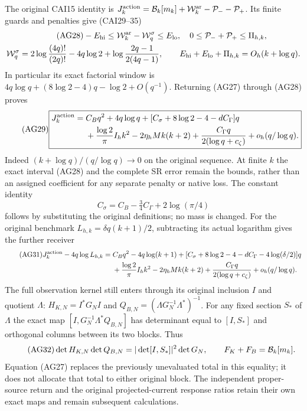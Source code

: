 \documentclass[11pt]{article}
\begin{document}
The original CAI15 identity is
$J_k^{\rm action}=\mathcal B_k[m_k]+\mathcal W_k^{\rm ar}-\mathcal P_--\mathcal P_+$.
Its finite guards and penalties give (CAI29--35)
\begin{gather}\tag{AG28}
 -E_{\rm hi}\le\mathcal W_k^{\rm ar}-\mathcal W_q^\sigma\le E_{\rm lo},
 \quad0\le\mathcal P_-+\mathcal P_+\le\Pi_{h,k},\\
 \mathcal W_q^\sigma=2\log\frac{(4q)!}{(2q)!}-4q\log2
       +\log\frac{2q-1}{2(4q-1)},\qquad
 E_{\rm hi}+E_{\rm lo}+\Pi_{h,k}=O_h(k+\log q).\notag
\end{gather}
In particular its exact factorial window is
$4q\log q+(8\log2-4)q-\log2+O(q^{-1})$.
Returning (AG27) through (AG28) proves
\begin{equation}\tag{AG29}
 \boxed{\begin{aligned}J_k^{\rm action}={}&C_Bq^2+4q\log q
  +[C_\sigma+8\log2-4-dC_\Gamma]q\\
 &+\frac{\log2}{\pi}I_hk^2-2\eta_hMk(k+2)
  +\frac{C_\Gamma q}{2(\log q+c_\zeta)}+o_h(q/\log q).
 \end{aligned}}
\end{equation}
Indeed $(k+\log q)/(q/\log q)\to0$ on the original sequence. At finite $k$
the exact interval (AG28) and the complete SR error remain the bounds,
rather than an assigned coefficient for any separate penalty or native loss.
The constant identity
\begin{equation}\tag{AG30}
 C_\sigma=C_B-\tfrac34 C_\Gamma+2\log(\pi/4)
\end{equation}
follows by substituting the original definitions; no mass is changed.
For the original benchmark $L_{h,k}=\delta q(k+1)/2$, subtracting its
actual logarithm gives the further receiver
\begin{align}\tag{AG31}
 J_k^{\rm action}-4q\log L_{h,k}
 ={}&C_Bq^2-4q\log(k+1)
 +[C_\sigma+8\log2-4-dC_\Gamma-4\log(\delta/2)]q\\
 &+\frac{\log2}{\pi}I_hk^2-2\eta_hMk(k+2)
 +\frac{C_\Gamma q}{2(\log q+c_\zeta)}+o_h(q/\log q).\notag
\end{align}
The full observation kernel still enters through its original inclusion
$I$ and quotient $\Lambda$: $H_{K,N}=I^*G_NI$ and
$Q_{B,N}=(\Lambda G_N^{-1}\Lambda^*)^{-1}$.
For any fixed section $S_*$ of $\Lambda$ the exact map
$[I,G_N^{-1}\Lambda^*Q_{B,N}]$ has determinant equal to $[I,S_*]$ and
orthogonal columns between its two blocks. Thus
\begin{equation}\tag{AG32}
 \det H_{K,N}\det Q_{B,N}=|\det[I,S_*]|^2\det G_N,
 \qquad F_K+F_B=\mathcal B_k[m_k].
\end{equation}
Equation (AG27) replaces the previously unevaluated total in this equality;
it does not allocate that total to either original block. The independent
proper-source return and the original projected-current response ratios
retain their own exact maps and remain subsequent calculations.
\end{document}
